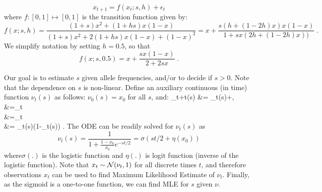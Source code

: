 \documentclass[11pt]{article}
\begin{document}
\begin{equation}
x_{t+1} = f(x_t;s,h) + \epsilon_t
\label{eq:trans0} 
\end{equation}
where $f: [0,1] \mapsto [0,1]$ is the
transition function given by:
\begin{equation}
f(x;s,h)=\frac{(1+s)x^2 + (1+hs)x(1-x)}{(1+s)x^2 + 2(1+hs)x(1-x) + (1-x)^2}
=x+\frac{s(h+(1-2h)x)x(1-x)}{1+sx(2h+(1-2h)x))}\;.
\end{equation}
We simplify notation by setting $h=0.5$, so that
\begin{equation}
f(x;s,0.5)=x+\frac{sx(1-x)}{2+2sx}\;.
\label{eq:hequalshalf}
\end{equation}


Our goal is to estimate $s$ given allele frequencies, and/or to decide
if $s>0$. Note that the dependence on $s$ is non-linear. Define an
auxiliary continuous (in time) function $\nu_t(s)$ as follows:
$\nu_0(s)=x_0$ for all $s$, and:
\beqq
\nu_{t+\delta t}(s) &= \nu_t(s)+\;,\\
 &=\lim_{\delta t}\\
&=\lim_{\delta t}\\
&= \nu_t(s)(1-\nu_t(s)) \;.
\label{eq:ode}
\eeqq
The ODE can be readily solved for $\nu_t(s)$ as
\begin{equation}
\nu_t(s) =\frac{1}{1+\frac{1-x_0}{x_0}e^{-st/2}} = \sigma(st/2+\eta(x_0)) 
\label{eq:inf-pop}
\end{equation}
where$\sigma(.)$ is the logistic
function and $\eta(.)$ is logit function (inverse of the logistic function). Note 
that $x_t\sim{\cal N}(\nu_t,1)$ for all discrete times $t$,
and therefore observations $x_t$ can be used to find Maximum
Likelihood Estimate of $\nu_t$. Finally, as the sigmoid is a
one-to-one function, we can find MLE for $s$ given {\bf $\nu$}.
\end{document}

